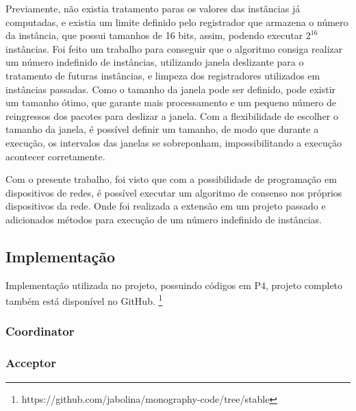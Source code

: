 \documentclass[
    12pt,
    openright, 
    oneside,
    a4paper,
    french,
    english,
    brazil
    ]{facom-ufu-abntex2}
\theoremstyle{definition}
\begin{document}
Previamente, não existia tratamento paras os valores das instâncias já computadas, e existia um limite definido pelo registrador
que armazena o número da instância, que possui tamanhos de 16 bits, assim, podendo executar $2^{16}$ instâncias. Foi feito um trabalho
para conseguir que o algoritmo consiga realizar um número indefinido de instâncias, utilizando janela deslizante para o tratamento 
de futuras instâncias, e limpeza dos registradores utilizados em instâncias passadas. Como o tamanho da janela pode ser definido, 
pode existir um tamanho ótimo, que garante mais processamento e um pequeno número de reingressos dos pacotes para deslizar a janela. 
Com a flexibilidade de escolher o tamanho da janela, é possível definir um tamanho, de modo que durante a execução, os intervalos das 
janelas se sobreponham, impossibilitando a execução acontecer corretamente.

Com o presente trabalho, foi visto que com a possibilidade de programação em dispositivos de redes, é possível executar um algoritmo
de consenso nos próprios dispositivos da rede. Onde foi realizada a extensão em um projeto passado e adicionados métodos para execução
de um número indefinido de instâncias. 



\begin{apendicesenv}
\partapendices
\chapter{Implementação}

Implementação utilizada no projeto, possuindo códigos em P4, projeto completo também está disponível no GitHub.
\footnote{https://github.com/jabolina/monography-code/tree/stable}

\subsection{Coordinator}


\subsection{Acceptor}


\end{apendicesenv}
\end{document}
